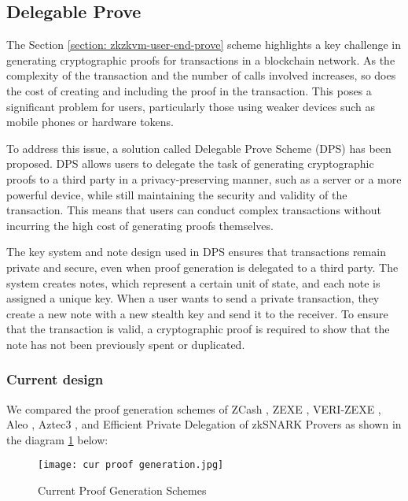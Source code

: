 \subsection{Delegable Prove}\label{section: zk-zkvm-delegable-prove}

The Section \ref{section: zkzkvm-user-end-prove} scheme highlights a key challenge in generating cryptographic proofs for transactions in a blockchain network. As the complexity of the transaction and the number of calls involved increases, so does the cost of creating and including the proof in the transaction. This poses a significant problem for users, particularly those using weaker devices such as mobile phones or hardware tokens.

To address this issue, a solution called Delegable Prove Scheme (DPS) has been proposed. DPS allows users to delegate the task of generating cryptographic proofs to a third party in a privacy-preserving manner, such as a server or a more powerful device, while still maintaining the security and validity of the transaction. This means that users can conduct complex transactions without incurring the high cost of generating proofs themselves.

The key system and note design used in DPS ensures that transactions remain private and secure, even when proof generation is delegated to a third party. The system creates notes, which represent a certain unit of state, and each note is assigned a unique key. When a user wants to send a private transaction, they create a new note with a new stealth key and send it to the receiver. To ensure that the transaction is valid, a cryptographic proof is required to show that the note has not been previously spent or duplicated.

\subsubsection{Current design}

We compared the proof generation schemes of ZCash \cite{website:zcash-nu5}, ZEXE \cite{cryptoeprint:2018/962}, VERI-ZEXE \cite{cryptoeprint:2022/802}, Aleo \cite{website:aleo-vm}, Aztec3 \cite{website:Aztec3}, and Efficient Private Delegation of zkSNARK Provers \cite{website:epdzp} as shown in the diagram \ref{fig:cur_proof_generation} below:
\begin{figure}[!ht]
    \centering
    \texttt{[image: cur proof generation.jpg]}
    \caption{Current Proof Generation Schemes}
    \label{fig:cur_proof_generation}
\end{figure}

